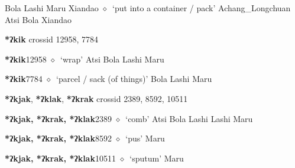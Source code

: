 \begin{list}{}{\leftmargin=1.5em \itemindent=-1.5em}
\hspace{1ex}
         Bola 
\hspace{1ex}
         Lashi 
\hspace{1ex}
         Maru 
\hspace{1ex}
         Xiandao 
\hspace{1ex}
         $\diamond$~`put into a container / pack'
         Achang\_Longchuan 
\hspace{1ex}
         Atsi 
\hspace{1ex}
         Bola 
\hspace{1ex}
         Xiandao 
  \end{list}
\item
\textbf{*ʔkik}
  {\tiny crossid 12958, 7784}
  \begin{list}{}{\leftmargin=1.5em \itemindent=-1.5em}
  \item {\footnotesize \textbf{*ʔkik}}{\tiny 12958}
         $\diamond$~`wrap'
         Atsi 
\hspace{1ex}
         Bola 
\hspace{1ex}
         Lashi 
\hspace{1ex}
         Maru 
  \item {\footnotesize \textbf{*ʔkik}}{\tiny 7784}
\hspace{1ex}
         $\diamond$~`parcel / sack (of things)'
         Bola 
\hspace{1ex}
         Lashi 
\hspace{1ex}
         Maru 
  \end{list}
\item
\textbf{*ʔkjak}, \textbf{*ʔklak}, \textbf{*ʔkrak}
  {\tiny crossid 2389, 8592, 10511}
  \begin{list}{}{\leftmargin=1.5em \itemindent=-1.5em}
  \item {\footnotesize \textbf{*ʔkjak, *ʔkrak, *ʔklak}}{\tiny 2389}
         $\diamond$~`comb'
         Atsi 
\hspace{1ex}
         Bola 
\hspace{1ex}
         Lashi 
\hspace{1ex}
         Lashi 
\hspace{1ex}
         Maru 
  \item {\footnotesize \textbf{*ʔkjak, *ʔkrak, *ʔklak}}{\tiny 8592}
\hspace{1ex}
         $\diamond$~`pus'
         Maru 
  \item {\footnotesize \textbf{*ʔkjak, *ʔkrak, *ʔklak}}{\tiny 10511}
\hspace{1ex}
         $\diamond$~`sputum'
         Maru 
  \end{list}
